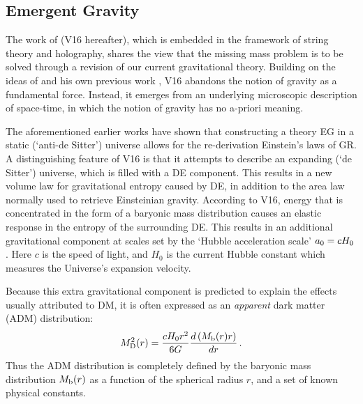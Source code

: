 \documentclass[fleqn,usenatbib]{mnras}
\newcommand{\un}[1]{_{\rm #1}}
\begin{document}
\subsection{Emergent Gravity}
\label{sec:EG}

The work of \cite{verlinde2016} (V16 hereafter), which is embedded in the framework of string theory and holography, shares the view that the missing mass problem is to be solved through a revision of our current gravitational theory. Building on the ideas of \cite{jacobson1995,jacobson2016,padmanabhan2010,faulkner2015} and his own previous work \cite[]{verlinde2011}, V16 abandons the notion of gravity as a fundamental force. Instead, it emerges from an underlying microscopic description of space-time, in which the notion of gravity has no a-priori meaning.

The aforementioned earlier works have shown that constructing a theory EG in a static (`anti-de Sitter') universe allows for the re-derivation Einstein's laws of GR. A distinguishing feature of V16 is that it attempts to describe an expanding (`de Sitter') universe, which is filled with a DE component. This results in a new volume law for gravitational entropy caused by DE, in addition to the area law normally used to retrieve Einsteinian gravity. According to V16, energy that is concentrated in the form of a baryonic mass distribution causes an elastic response in the entropy of the surrounding DE. This results in an additional gravitational component at scales set by the `Hubble acceleration scale' $a\un{0} = c H_0$. Here $c$ is the speed of light, and $H_0$ is the current Hubble constant which measures the Universe's expansion velocity.

Because this extra gravitational component is predicted to explain the effects usually attributed to DM, it is often expressed as an \emph{apparent} dark matter (ADM) distribution:
\begin{equation}
M_{\rm D}^2 (r) = \frac{  cH_0 r^2}{6G} \frac{d\left( M_{\rm b}(r) r \right)}{dr} \, .
\label{eq:veg_mdm}
\end{equation}
Thus the ADM distribution is completely defined by the baryonic mass distribution $M\un{b}(r)$ as a function of the spherical radius $r$, and a set of known physical constants.
\end{document}
